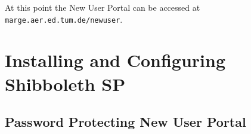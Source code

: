 At this point the New User Portal can be accessed at
\texttt{marge.aer.ed.tum.de/newuser}.

\section{Installing and Configuring Shibboleth SP}\label{section:shibboleth}

\subsection{Password Protecting New User Portal}
